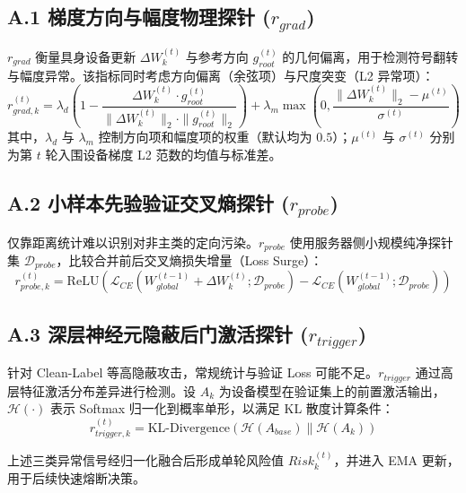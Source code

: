 \documentclass[11pt, a4paper, UTF8, fontset=fandol]{ctexart}
\begin{document}
\subsection{A.1 梯度方向与幅度物理探针 ($r_{grad}$)}
$r_{grad}$ 衡量具身设备更新 $\Delta W_k^{(t)}$ 与参考方向 $g_{root}^{(t)}$ 的几何偏离，用于检测符号翻转与幅度异常。该指标同时考虑方向偏离（余弦项）与尺度突变（L2 异常项）：
\begin{equation}
    r_{grad, k}^{(t)} = \lambda_{d} \left(1 - \frac{\Delta W_k^{(t)} \cdot g_{root}^{(t)}}{\|\Delta W_k^{(t)}\|_2 \cdot \|g_{root}^{(t)}\|_2}\right) + \lambda_{m} \max\left(0, \frac{\|\Delta W_k^{(t)}\|_2 - \mu^{(t)}}{\sigma^{(t)}}\right)
\end{equation}
其中，$\lambda_d$ 与 $\lambda_m$ 控制方向项和幅度项的权重（默认均为 $0.5$）；$\mu^{(t)}$ 与 $\sigma^{(t)}$ 分别为第 $t$ 轮入围设备梯度 L2 范数的均值与标准差。

\subsection{A.2 小样本先验验证交叉熵探针 ($r_{probe}$)}
仅靠距离统计难以识别对非主类的定向污染。$r_{probe}$ 使用服务器侧小规模纯净探针集 $\mathcal{D}_{probe}$，比较合并前后交叉熵损失增量（Loss Surge）：
\begin{equation}
    r_{probe, k}^{(t)} = \text{ReLU}\left( \mathcal{L}_{CE}(W_{global}^{(t-1)} + \Delta W_k^{(t)}; \mathcal{D}_{probe}) - \mathcal{L}_{CE}(W_{global}^{(t-1)}; \mathcal{D}_{probe}) \right)
\end{equation}

\subsection{A.3 深层神经元隐蔽后门激活探针 ($r_{trigger}$)}
针对 Clean-Label 等高隐蔽攻击，常规统计与验证 Loss 可能不足。$r_{trigger}$ 通过高层特征激活分布差异进行检测。设 $A_k$ 为设备模型在验证集上的前置激活输出，$\mathcal{H}(\cdot)$ 表示 Softmax 归一化到概率单形，以满足 KL 散度计算条件：
\begin{equation}
    r_{trigger, k}^{(t)} = \text{KL-Divergence}\left( \mathcal{H}(A_{base}) \| \mathcal{H}(A_k) \right)
\end{equation}

上述三类异常信号经归一化融合后形成单轮风险值 $Risk_{k}^{(t)}$，并进入 EMA 更新，用于后续快速熔断决策。
\end{document}
